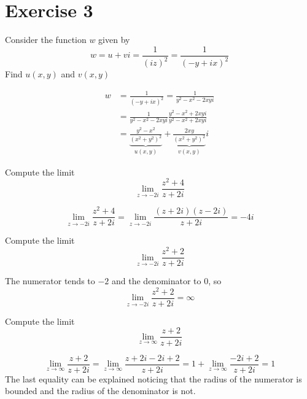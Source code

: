 \documentclass{report}
\begin{document}
    \section*{Exercise 3}
    \begin{tcolorbox}[title=Part a]
        Consider the function $w$ given by
        \begin{equation*}
            w = u + vi = \frac{1}{(iz)^2} = \frac{1}{(-y + ix)^2}
        \end{equation*}
        Find $u(x, y)$ and $v(x, y)$
    \end{tcolorbox}
    \noindent
    \begin{align*}
        w &= \frac{1}{(-y + ix)^2} = \frac{1}{y^2 - x^2 -2xyi} \\
        &= \frac{1}{y^2 - x^2 -2xyi} \frac{y^2 - x^2 + 2xyi}{y^2 - x^2 + 2xyi} \\
        &= \underbrace{\frac{y^2 - x^2}{(x^2 + y^2)^2}}_{u(x, y)} + \underbrace{\frac{2xy}{(x^2 + y^2)^2}}_{v(x, y)}i
    \end{align*}
    \begin{tcolorbox}[title=Part b.i]
        Compute the limit
        \begin{equation*}
            \lim_{z \to -2i}{\frac{z^2 + 4}{z + 2i}}
        \end{equation*}
    \end{tcolorbox}
    \begin{equation*}
        \lim_{z \to -2i}{\frac{z^2 + 4}{z + 2i}} = \lim_{z \to -2i}{\frac{(z + 2i)(z - 2i)}{z + 2i}} = -4i
    \end{equation*}
    \begin{tcolorbox}[title=Part b.ii]
        Compute the limit
        \begin{equation*}
            \lim_{z \to -2i}{\frac{z^2 + 2}{z + 2i}}
        \end{equation*}
    \end{tcolorbox}
    \noindent
    The numerator tends to $-2$ and the denominator to $0$, so
    \begin{equation*}
        \lim_{z \to -2i}{\frac{z^2 + 2}{z + 2i}} = \infty
    \end{equation*}
    \begin{tcolorbox}[title=Part b.iii]
        Compute the limit
        \begin{equation*}
            \lim_{z \to \infty}{\frac{z + 2}{z + 2i}}
        \end{equation*}
    \end{tcolorbox}
    \begin{equation*}
        \lim_{z \to \infty}{\frac{z + 2}{z + 2i}} = \lim_{z \to \infty}{\frac{z + 2i - 2i + 2}{z + 2i}} = 1 + \lim_{z \to \infty}{\frac{-2i + 2}{z + 2i}} = 1
    \end{equation*}
    The last equality can be explained noticing that the radius of the numerator is bounded and the radius of the denominator is not.
\end{document}
